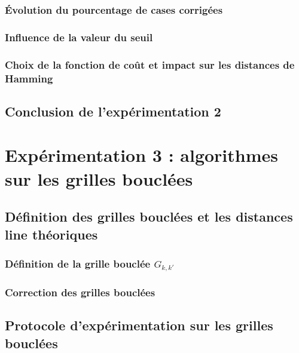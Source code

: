 \documentclass[onecolumn, 12pt]{book}
\begin{document}
		\subsubsection{\'Evolution du pourcentage de cases corrig\'ees}
			
		\subsubsection{Influence de la valeur du seuil }
			
		\subsubsection{Choix de la fonction de co\^ut et impact sur les distances de Hamming }
			
	\subsection{Conclusion de l'exp\'erimentation 2}	
				

\section{Exp\'erimentation 3 : algorithmes sur les grilles boucl\'ees}
	
	\subsection{D\'efinition des grilles boucl\'ees et les distances line th\'eoriques}
%		
		\subsubsection{D\'efinition de la grille boucl\'ee $G_{k,k'}$ }
			
		\subsubsection{Correction des grilles boucl\'ees}
			
	\subsection{Protocole d'exp\'erimentation sur les grilles boucl\'ees}
		
\end{document}
